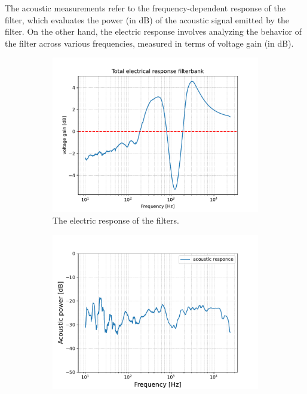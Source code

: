 The acoustic measurements refer to the frequency-dependent response of the filter, which evaluates the power (in dB) of the acoustic signal emitted by the filter. On the other hand, the electric response involves analyzing the behavior of the filter across various frequencies, measured in terms of voltage gain (in dB).
\begin{figure}[H]
    \centering
    \begin{subfigure}[t]{0.48\textwidth}
        \centering
        \includegraphics[width=\textwidth]{TU Delft Booming Bass Project Report/figures/FilterGroup/total_electric_response.pdf}
        \caption{The electric response of the filters.}
        \label{fig:electric_response}
    \end{subfigure}
    \hfill
    \begin{subfigure}[t]{0.48\textwidth}
        \centering
        \includegraphics[width=\textwidth]{TU Delft Booming Bass Project Report/figures/FilterGroup/acoustic_response.pdf}

\end{subfigure}
\end{figure}
